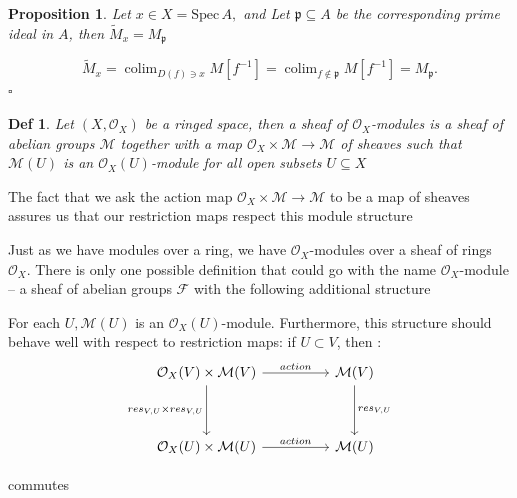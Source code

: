 \documentclass{article}
\newtheorem{definition}[theorem]{Def}
\newtheorem{proposition}[theorem]{Proposition}
\newenvironment{Proof}{{\noindent \indent \it Proof:\quad}}{\hfill $\square$\par}
\begin{document}
\begin{proposition}
    Let $x\in X={\mathrm{Spec}}\,A,$ and Let ${\mathfrak{p}}\subseteq A$ be the corresponding prime ideal in $A$, then $\widetilde{M}_{x}=M_{\mathfrak{p}}$
\end{proposition}

\begin{Proof}
$$
\widetilde{M}_{x}=\operatorname{colim}_{D(f)\ni x}M[f^{-1}]=\operatorname{colim}_{f\notin{\mathfrak{p}}}M[f^{-1}]=M_{\mathfrak{p}}. 
$$
\end{Proof}

\begin{definition}
Let $(X,{\mathcal{O}}_{X})$ be a ringed space, then a sheaf of ${\mathcal{O}}_{X}$-modules is a sheaf of abelian groups $\mathcal M$ together with a map ${\mathcal{O}}_{X}\times{\mathcal{M}} \to{\mathcal{M}}$ of sheaves such that ${\mathcal{M}}(U)$ is an ${\mathcal{O}}_{X}(U)$-module for all open subsets $U\subseteq X$ 
\end{definition}

The fact that we ask the action map ${\mathcal{O}}_{X}\times{\mathcal{M}} \to{\mathcal{M}}$ to be a map of sheaves assures us that our restriction maps respect this module structure

Just as we have modules over a ring, we have ${\mathcal{O}}_{X}$-modules over a sheaf of rings ${\mathcal{O}}_{X}$. There is only one possible definition that could go with the name ${\mathcal{O}}_{X}$-module -- a sheaf of abelian groups $\mathcal{F}$ with the following additional structure

For each $U,\mathcal{M}(U)$ is an ${\mathcal{O}}_{X}(U)$-module. Furthermore, this structure should behave well with respect to restriction maps: if $U\subset V$, then :
\[\begin{tikzcd}
	{\mathcal O_X(V)\times\mathcal M(V)} && {\mathcal M(V)} \\
	\\
	{\mathcal O_X(U)\times\mathcal M(U)} && {\mathcal M(U)}
	\arrow["{res_{V,U}\times res_{V,U}}"', from=1-1, to=3-1]
	\arrow["action", from=1-1, to=1-3]
	\arrow["{res_{V,U}}", from=1-3, to=3-3]
	\arrow["action", from=3-1, to=3-3]
\end{tikzcd}\]

commutes
\end{document}
